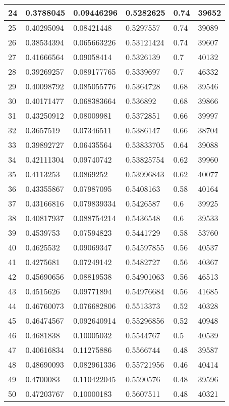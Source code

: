 \begin{longtable}{|l|l|l|l|l|l|}
24 & 0.3788045 & 0.09446296 & 0.5282625 & 0.74 & 39652 \\ \hline 
25 & 0.40295094 & 0.08421448 & 0.5297557 & 0.74 & 39089 \\ \hline 
26 & 0.38534394 & 0.065663226 & 0.53121424 & 0.74 & 39607 \\ \hline 
27 & 0.41666564 & 0.09058414 & 0.5326139 & 0.7 & 40132 \\ \hline 
28 & 0.39269257 & 0.089177765 & 0.5339697 & 0.7 & 46332 \\ \hline 
29 & 0.40098792 & 0.085055776 & 0.5364728 & 0.68 & 39546 \\ \hline 
30 & 0.40171477 & 0.068383664 & 0.536892 & 0.68 & 39866 \\ \hline 
31 & 0.43250912 & 0.08009981 & 0.5372851 & 0.66 & 39997 \\ \hline 
32 & 0.3657519 & 0.07346511 & 0.5386147 & 0.66 & 38704 \\ \hline 
33 & 0.39892727 & 0.06435564 & 0.53833705 & 0.64 & 39088 \\ \hline 
34 & 0.42111304 & 0.09740742 & 0.53825754 & 0.62 & 39960 \\ \hline 
35 & 0.4113253 & 0.0869252 & 0.53996843 & 0.62 & 40077 \\ \hline 
36 & 0.43355867 & 0.07987095 & 0.5408163 & 0.58 & 40164 \\ \hline 
37 & 0.43166816 & 0.079839334 & 0.5426587 & 0.6 & 39925 \\ \hline 
38 & 0.40817937 & 0.088754214 & 0.5436548 & 0.6 & 39533 \\ \hline 
39 & 0.4539753 & 0.07594823 & 0.5441729 & 0.58 & 53760 \\ \hline 
40 & 0.4625532 & 0.09069347 & 0.54597855 & 0.56 & 40537 \\ \hline 
41 & 0.4275681 & 0.07249142 & 0.5482727 & 0.56 & 40367 \\ \hline 
42 & 0.45690656 & 0.08819538 & 0.54901063 & 0.56 & 46513 \\ \hline 
43 & 0.4515626 & 0.09771894 & 0.54976684 & 0.56 & 41685 \\ \hline 
44 & 0.46760073 & 0.076682806 & 0.5513373 & 0.52 & 40328 \\ \hline 
45 & 0.46474567 & 0.092640914 & 0.55296856 & 0.52 & 40948 \\ \hline 
46 & 0.4681838 & 0.10005032 & 0.5544767 & 0.5 & 40539 \\ \hline 
47 & 0.40616834 & 0.11275886 & 0.5566744 & 0.48 & 39587 \\ \hline 
48 & 0.48690093 & 0.082961336 & 0.55721956 & 0.46 & 40414 \\ \hline 
49 & 0.4700083 & 0.110422045 & 0.5590576 & 0.48 & 39596 \\ \hline 
50 & 0.47203767 & 0.10000183 & 0.5607511 & 0.48 & 40321 \\ \hline 
\end{longtable}